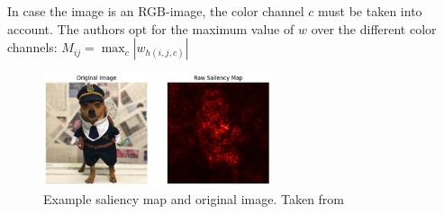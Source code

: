 In case the image is an RGB-image, the color channel $c$ must be taken into account. The authors \citep{simonyan2013deep} opt for the maximum value of $w$ over the different color channels: $M_{ij} = \max_{c} \left| w_{h(i,j,c)}\right|$

\begin{figure}
    \centering
    \includegraphics[width=0.6\textwidth]{Grad Assignment/Images/saliency_example.png}
    \caption{Example saliency map and original image. Taken from \citep{newginsam2024}}
    \label{fig:saliency_example}
\end{figure}




